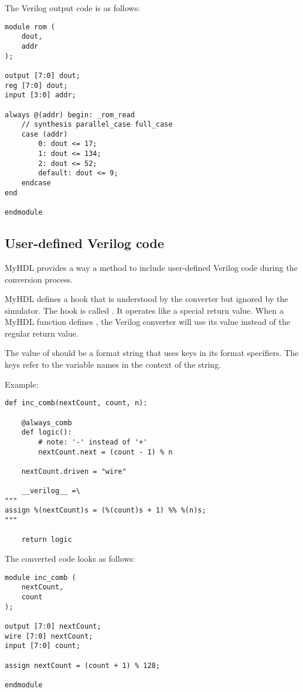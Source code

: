 The Verilog output code is as follows:

\begin{verbatim}
module rom (
    dout,
    addr
);
                                                                                
output [7:0] dout;
reg [7:0] dout;
input [3:0] addr;
                                                                       
always @(addr) begin: _rom_read
    // synthesis parallel_case full_case
    case (addr)
        0: dout <= 17;
        1: dout <= 134;
        2: dout <= 52;
        default: dout <= 9;
    endcase
end
                                                                                
endmodule
\end{verbatim}

\subsection{User-defined Verilog code \label{conf-usage-custom}}

MyHDL provides a way a method to include user-defined Verilog
code during the conversion process.

MyHDL defines a hook that is understood by the converter but ignored by
the simulator. The hook is called . It operates
like a special return value. When a MyHDL function defines
, the Verilog converter will use its value instead of the
regular return value.

The value of  should be a format string that uses keys in
its format specifiers. The keys refer to the variable names in the
context of the string.

Example:

\begin{verbatim}
def inc_comb(nextCount, count, n):

    @always_comb
    def logic():
        # note: '-' instead of '+'
        nextCount.next = (count - 1) % n

    nextCount.driven = "wire"

    __verilog__ =\
"""
assign %(nextCount)s = (%(count)s + 1) %% %(n)s;
"""

    return logic
\end{verbatim}

The converted code looks as follows:

\begin{verbatim}
module inc_comb (
    nextCount,
    count
);

output [7:0] nextCount;
wire [7:0] nextCount;
input [7:0] count;

assign nextCount = (count + 1) % 128;

endmodule
\end{verbatim}

